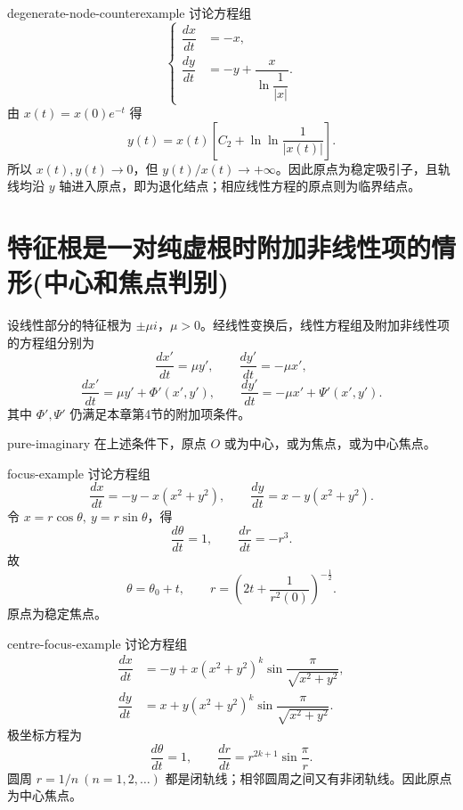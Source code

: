 \begin{example}{}{degenerate-node-counterexample}
讨论方程组
\[
\left\{\begin{aligned}
\dfrac{dx}{dt}&=-x,\\
\dfrac{dy}{dt}&=-y+\dfrac{x}{\ln\dfrac1{|x|}}.
\end{aligned}\right.\tag{4.8}
\]
由 $x(t)=x(0)e^{-t}$ 得
\[
y(t)=x(t)\left[C_2+\ln\ln\dfrac1{|x(t)|}\right].
\]
所以 $x(t),y(t)\to0$，但 $y(t)/x(t)\to+\infty$。因此原点为稳定吸引子，且轨线均沿 $y$ 轴进入原点，即为退化结点；相应线性方程的原点则为临界结点。
\end{example}

\section{特征根是一对纯虚根时附加非线性项的情形(中心和焦点判别)}
设线性部分的特征根为 $\pm\mu i$，$\mu>0$。经线性变换后，线性方程组及附加非线性项的方程组分别为
\[
\dfrac{dx'}{dt}=\mu y',\qquad \dfrac{dy'}{dt}=-\mu x',
\tag{5.1}
\]
\[
\dfrac{dx'}{dt}=\mu y'+\Phi'(x',y'),\qquad
\dfrac{dy'}{dt}=-\mu x'+\Psi'(x',y').
\tag{5.2}
\]
其中 $\Phi',\Psi'$ 仍满足本章第4节的附加项条件。

\begin{theorem}{}{pure-imaginary}
在上述条件下，原点 $O$ 或为中心，或为焦点，或为中心焦点。
\end{theorem}

\begin{example}{}{focus-example}
讨论方程组
\[
\dfrac{dx}{dt}=-y-x(x^2+y^2),\qquad
\dfrac{dy}{dt}=x-y(x^2+y^2).
\tag{5.3}
\]
令 $x=r\cos\theta,\ y=r\sin\theta$，得
\[
\dfrac{d\theta}{dt}=1,\qquad \dfrac{dr}{dt}=-r^3.
\]
故
\[
\theta=\theta_0+t,\qquad
r=\left(2t+\dfrac1{r^2(0)}\right)^{-\frac12}.
\]
原点为稳定焦点。
\end{example}

\begin{example}{}{centre-focus-example}
讨论方程组
\[
\begin{aligned}
\dfrac{dx}{dt}&=-y+x(x^2+y^2)^k
 \sin\dfrac{\pi}{\sqrt{x^2+y^2}},\\
\dfrac{dy}{dt}&=x+y(x^2+y^2)^k
 \sin\dfrac{\pi}{\sqrt{x^2+y^2}}.
\end{aligned}
\tag{5.4}
\]
极坐标方程为
\[
\dfrac{d\theta}{dt}=1,\qquad
\dfrac{dr}{dt}=r^{2k+1}\sin\dfrac{\pi}{r}.
\]
圆周 $r=1/n\ (n=1,2,\ldots)$ 都是闭轨线；相邻圆周之间又有非闭轨线。因此原点为中心焦点。
\end{example}

